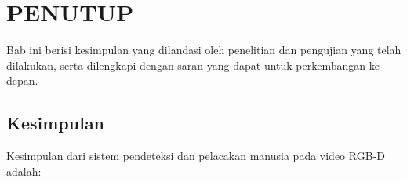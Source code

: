 \chapter{PENUTUP}

%
\vspace{4.5pt}
\noindent Bab ini berisi kesimpulan yang dilandasi oleh penelitian dan pengujian yang telah dilakukan, serta dilengkapi dengan saran yang dapat untuk perkembangan ke depan.\\

\section{Kesimpulan}
\noindent Kesimpulan dari sistem pendeteksi dan pelacakan manusia pada video RGB-D adalah:
